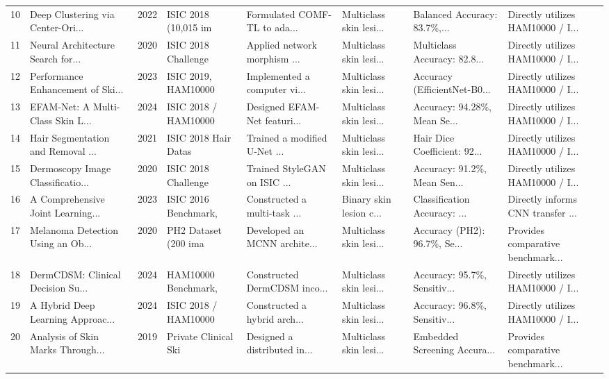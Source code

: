 \documentclass[11pt,a4paper]{article}
\begin{document}
\begin{small}
\begin{longtable}{p{0.5cm} p{2.2cm} p{0.8cm} p{1.8cm} p{2.0cm} p{2.0cm} p{2.0cm} p{2.5cm}}
10 & Deep Clustering via Center-Ori... & 2022 & ISIC 2018 (10,015 im & Formulated COMF-TL to ada... & Multiclass skin lesi... & Balanced Accuracy: 83.7\%,... & Directly utilizes HAM10000 / I... \\
11 & Neural Architecture Search for... & 2020 & ISIC 2018 Challenge  & Applied network morphism ... & Multiclass skin lesi... & Multiclass Accuracy: 82.8... & Directly utilizes HAM10000 / I... \\
12 & Performance Enhancement of Ski... & 2023 & ISIC 2019, HAM10000 & Implemented a computer vi... & Multiclass skin lesi... & Accuracy (EfficientNet-B0... & Directly utilizes HAM10000 / I... \\
13 & EFAM-Net: A Multi-Class Skin L... & 2024 & ISIC 2018 / HAM10000 & Designed EFAM-Net featuri... & Multiclass skin lesi... & Accuracy: 94.28\%, Mean Se... & Directly utilizes HAM10000 / I... \\
14 & Hair Segmentation and Removal ... & 2021 & ISIC 2018 Hair Datas & Trained a modified U-Net ... & Multiclass skin lesi... & Hair Dice Coefficient: 92... & Directly utilizes HAM10000 / I... \\
15 & Dermoscopy Image Classificatio... & 2020 & ISIC 2018 Challenge  & Trained StyleGAN on ISIC ... & Multiclass skin lesi... & Accuracy: 91.2\%, Mean Sen... & Directly utilizes HAM10000 / I... \\
16 & A Comprehensive Joint Learning... & 2023 & ISIC 2016 Benchmark, & Constructed a multi-task ... & Binary skin lesion c... & Classification Accuracy: ... & Directly informs CNN transfer ... \\
17 & Melanoma Detection Using an Ob... & 2020 & PH2 Dataset (200 ima & Developed an MCNN archite... & Multiclass skin lesi... & Accuracy (PH2): 96.7\%, Se... & Provides comparative benchmark... \\
18 & DermCDSM: Clinical Decision Su... & 2024 & HAM10000 Benchmark,  & Constructed DermCDSM inco... & Multiclass skin lesi... & Accuracy: 95.7\%, Sensitiv... & Directly utilizes HAM10000 / I... \\
19 & A Hybrid Deep Learning Approac... & 2024 & ISIC 2018 / HAM10000 & Constructed a hybrid arch... & Multiclass skin lesi... & Accuracy: 96.8\%, Sensitiv... & Directly utilizes HAM10000 / I... \\
20 & Analysis of Skin Marks Through... & 2019 & Private Clinical Ski & Designed a distributed in... & Multiclass skin lesi... & Embedded Screening Accura... & Provides comparative benchmark... \\

\end{longtable}
\end{small}
\end{document}
